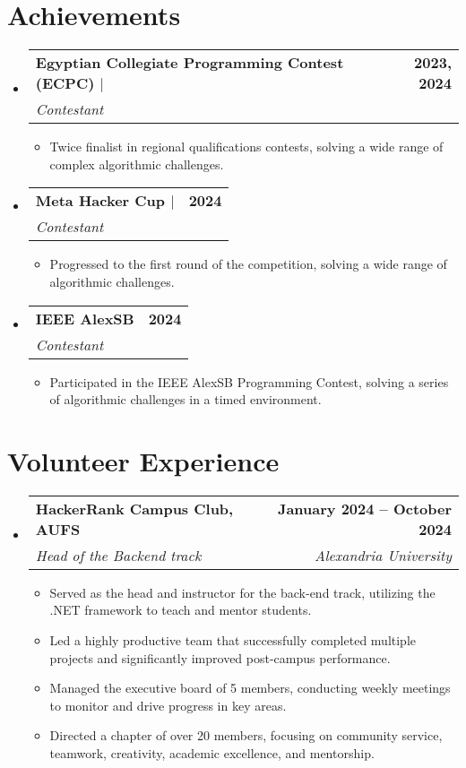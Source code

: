 \documentclass[letterpaper,11pt]{article}
\makeatletter
\newcommand{\resumeItem}[1]{
  \item\small{
    {#1 \vspace{-2pt}}
  }
}
\newcommand{\resumeSubheading}[4]{
  \vspace{-2pt}\item
    \begin{tabular*}{1.0\textwidth}[t]{l@{\extracolsep{\fill}}r}
      \textbf{#1} & \textbf{\small #2} \\
      \textit{\small#3} & \textit{\small #4} \\
    \end{tabular*}\vspace{-7pt}
}
\newcommand{\resumeSubHeadingListStart}{\begin{itemize}[leftmargin=0.0in, label={}]}
\newcommand{\resumeSubHeadingListEnd}{\end{itemize}}
\newcommand{\resumeItemListStart}{\begin{itemize}}
\newcommand{\resumeItemListEnd}{\end{itemize}\vspace{-5pt}}
\makeatother
\begin{document}
\section{Achievements}
  \resumeSubHeadingListStart
    \resumeSubheading
     {\textbf{Egyptian Collegiate Programming Contest (ECPC)} $|$ \href{https://icpc.global/ICPCID/8H1UPW16WJN6}{\faGlobe}}{2023, 2024} 
      {Contestant}{}
      \resumeItemListStart
        \resumeItem{Twice finalist in regional qualifications contests, solving a wide range of complex algorithmic challenges.}
      \resumeItemListEnd
    \resumeSubheading
    {\textbf{Meta Hacker Cup} $|$ \href{https://www.facebook.com/codingcompetitions/hacker-cup/2024/certificate/440863471706931}{\faGlobe}}{2024}
    {Contestant}{}
    \resumeItemListStart
    \resumeItem{Progressed to the first round of the competition, solving a wide range of algorithmic challenges.}
    \resumeItemListEnd

    \resumeSubheading
    {IEEE AlexSB}{2024}
    {Contestant}{}
    \resumeItemListStart
    \resumeItem{Participated in the IEEE AlexSB Programming Contest, solving a series of algorithmic challenges in a timed environment.}
    \resumeItemListEnd

  \resumeSubHeadingListEnd



\section{Volunteer Experience}
  \resumeSubHeadingListStart
    \resumeSubheading
      {HackerRank Campus Club,
AUFS}{January 2024 -- October 2024}
      {Head of the Backend track}{Alexandria University}
      \resumeItemListStart
        \resumeItem{Served as the head and instructor for the back-end track, utilizing the .NET framework to teach and mentor students.}
        \resumeItem{Led a highly productive team that successfully completed multiple projects and significantly improved post-campus performance.}
        \resumeItem{Managed the executive board of 5 members, conducting weekly meetings to monitor and drive progress in key areas.}
        \resumeItem{Directed a chapter of over 20 members, focusing on community service, teamwork, creativity, academic excellence, and mentorship.}
      \resumeItemListEnd
     
  \resumeSubHeadingListEnd
\end{document}
